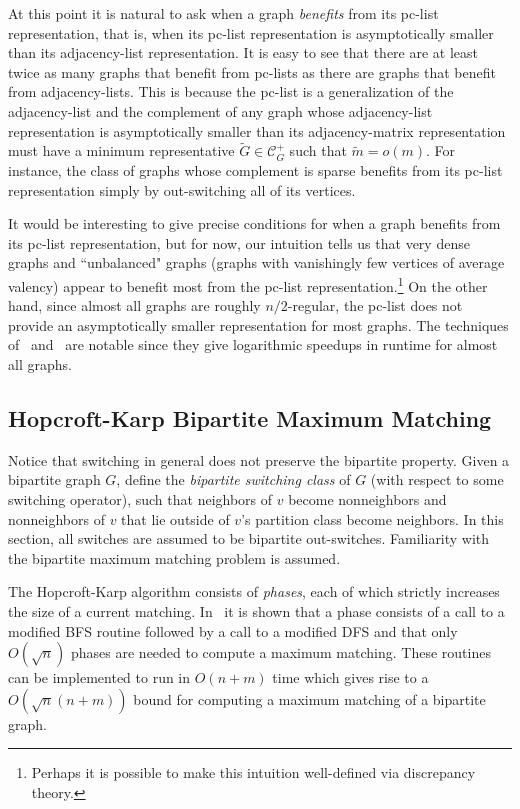 \documentclass{llncs}
\begin{document}
At this point it is natural to ask when a graph \emph{benefits} from its pc-list representation, that is, when its pc-list representation is asymptotically smaller than its adjacency-list representation.  It is easy to see that there are at least twice as many graphs that benefit from pc-lists as there are graphs that benefit from adjacency-lists.  This is because the pc-list is a generalization of the adjacency-list and the complement of any graph whose adjacency-list representation is asymptotically smaller than its adjacency-matrix representation must have a minimum representative $\widetilde{G} \in \mathcal{C}_G^+$ such that $\widetilde{m} = o(m)$.  For instance, the class of graphs whose complement is sparse benefits from its pc-list representation simply by out-switching all of its vertices. 

It would be interesting to give precise conditions for when a graph benefits from its pc-list representation, but for now, our intuition tells us that very dense graphs and ``unbalanced" graphs (graphs with vanishingly few vertices of average valency) appear to benefit most from the pc-list representation.\footnote{Perhaps it is possible to make this intuition well-defined via discrepancy theory.}  On the other hand, since almost all graphs are roughly $n/2$-regular, the pc-list does not provide an asymptotically smaller representation for most graphs.  The techniques of~\cite{CheriyanM96} and~\cite{FederM95} are notable since they give logarithmic speedups in runtime for almost all graphs.

\subsection{Hopcroft-Karp Bipartite Maximum Matching}

Notice that switching in general does not preserve the bipartite property.  Given a bipartite graph $G$, define the \emph{bipartite switching class} of $G$ (with respect to some switching operator), such that neighbors of $v$ become nonneighbors and nonneighbors of $v$ that lie outside of $v$'s partition class become neighbors.  In this section, all switches are assumed to be bipartite out-switches.  Familiarity with the bipartite maximum matching problem is assumed.

The Hopcroft-Karp algorithm consists of \emph{phases}, each of which strictly increases the size of a current matching.  In~\cite{HopcroftK73} it is shown that a phase consists of a call to a modified BFS routine followed by a call to a modified DFS and that only $O(\sqrt{n})$ phases are needed to compute a maximum matching.  These routines can be implemented to run in $O(n+m)$ time which gives rise to a $O(\sqrt{n}(n+m))$ bound for computing a maximum matching of a bipartite graph.  
\end{document}

